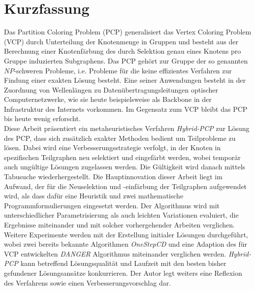 \chapter*{Kurzfassung}

Das Partition Coloring Problem (PCP) generalisiert das Vertex Coloring Problem (VCP) durch Unterteilung der Knotenmenge in Gruppen und besteht aus der Berechnung einer Knotenfärbung des durch Selektion genau eines Knotens pro Gruppe induzierten Subgraphens. Das PCP gehört zur Gruppe der so genannten $\mathit{NP}$-schweren Probleme, i.e. Probleme für die keine effizientes Verfahren zur Findung einer exakten Lösung besteht. Eine seiner Anwendungen besteht in der Zuordnung von Wellenlängen zu Datenübertragungsleitungen optischer Computernetzwerke, wie sie heute beispielsweise als Backbone in der Infrastruktur des Internets vorkommen. Im Gegensatz zum VCP bleibt das PCP bis heute wenig erforscht.\\

Diese Arbeit präsentiert ein metaheuristisches Verfahren \textit{Hybrid-PCP} zur Lösung des PCP, dass sich zusätzlich exakter Methoden bedient um Teilprobleme zu lösen. Dabei wird eine Verbesserungsstrategie verfolgt, in der Knoten in spezifischen Teilgraphen neu selektiert und eingefärbt werden, wobei temporär auch ungültige Lösungen zugelassen werden. Die Gültigkeit wird danach mittels Tabusuche wiederhergestellt. Die Hauptinnovation dieser Arbeit liegt im Aufwand, der für die Neuselektion und -einfärbung der Teilgraphen aufgewendet wird, als dass dafür eine Heuristik und zwei mathematische Programmformulierungen eingesetzt werden. Der Algorithmus wird mit unterschiedlicher Parametrisierung als auch leichten Variationen evaluiert, die Ergebnisse miteinander und mit solcher vorhergehender Arbeiten verglichen. Weitere Experimente werden mit der Erstellung initialer Lösungen durchgeführt, wobei zwei bereits bekannte Algorithmen \textit{OneStepCD} und eine Adaption des für VCP entwickelten \textit{DANGER} Algorithmus miteinander verglichen werden. \textit{Hybrid-PCP} kann betreffend Lösungsqualität und Laufzeit mit den besten bisher gefundener Lösungsansätze konkurrieren. Der Autor legt weiters eine Reflexion des Verfahrens sowie einen Verbesserungsvorschlag dar.
